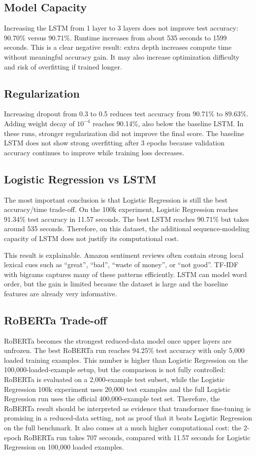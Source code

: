 \documentclass[conference]{IEEEtran}
\begin{document}
\subsection{Model Capacity}
Increasing the LSTM from 1 layer to 3 layers does not improve test accuracy:
90.70\% versus 90.71\%. Runtime increases from about 535 seconds to 1599
seconds. This is a clear negative result: extra depth increases compute time
without meaningful accuracy gain. It may also increase optimization difficulty
and risk of overfitting if trained longer.

\subsection{Regularization}
Increasing dropout from 0.3 to 0.5 reduces test accuracy from 90.71\% to
89.63\%. Adding weight decay of $10^{-4}$ reaches 90.14\%, also below the
baseline LSTM. In these runs, stronger regularization did not improve the final
score. The baseline LSTM does not show strong overfitting after 3 epochs because
validation accuracy continues to improve while training loss decreases.

\subsection{Logistic Regression vs LSTM}
The most important conclusion is that Logistic Regression is still the best
accuracy/time trade-off. On the 100k experiment, Logistic Regression reaches
91.34\% test accuracy in 11.57 seconds. The best LSTM reaches 90.71\% but takes
around 535 seconds. Therefore, on this dataset, the additional sequence-modeling
capacity of LSTM does not justify its computational cost.

This result is explainable. Amazon sentiment reviews often contain strong local
lexical cues such as ``great'', ``bad'', ``waste of money'', or ``not good''.
TF-IDF with bigrams captures many of these patterns efficiently. LSTM can model
word order, but the gain is limited because the dataset is large and the
baseline features are already very informative.

\subsection{RoBERTa Trade-off}
RoBERTa becomes the strongest reduced-data model once upper layers are unfrozen.
The best RoBERTa run reaches 94.25\% test accuracy with only 5,000 loaded
training examples. This number is higher than Logistic Regression on the
100,000-loaded-example setup, but the comparison is not fully controlled:
RoBERTa is evaluated on a 2,000-example test subset, while the Logistic
Regression 100k experiment uses 20,000 test examples and the full Logistic
Regression run uses the official 400,000-example test set. Therefore, the
RoBERTa result should be interpreted as evidence that transformer fine-tuning is
promising in a reduced-data setting, not as proof that it beats Logistic
Regression on the full benchmark. It also comes at a much higher computational
cost: the 2-epoch RoBERTa run takes 707 seconds, compared with 11.57 seconds
for Logistic Regression on 100,000 loaded examples.
\end{document}
